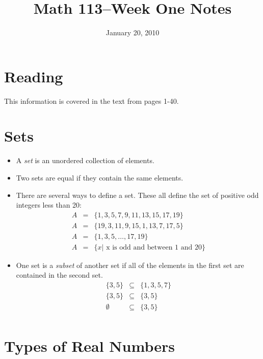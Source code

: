 \documentclass[fleqn]{article}
\title{Math 113--Week One Notes}
\author{}
\date{January 20, 2010}
\begin{document}
\maketitle

\section{Reading}

This information is covered in the text from pages 1-40.

\section{Sets}

\begin{itemize}
  \item A {\em set} is an unordered collection of elements.  

  \item Two sets are equal if they contain the same elements.

  \item There are several ways to define a set.  These all define the set of positive odd integers less than 20:
    \begin{eqnarray*}
      A & = & \{ 1, 3, 5, 7, 9, 11, 13, 15, 17, 19 \}          \\
      A & = & \{ 19, 3, 11, 9, 15, 1, 13, 7, 17, 5 \}          \\
      A & = & \{ 1, 3, 5, \ldots, 17, 19 \}                    \\
      A & = & \{ x | \text{ x is odd and between 1 and 20} \}
    \end{eqnarray*}

  \item One set is a {\em subset} of another set if all of the elements in the first set are contained in the second set.
    \begin{eqnarray*}
      \{ 3, 5 \} & \subseteq & \{ 1, 3, 5, 7 \}          \\
      \{ 3, 5 \} & \subseteq & \{ 3, 5 \} \\
      \emptyset  & \subseteq & \{ 3, 5 \} \\
    \end{eqnarray*}
\end{itemize}

\section{Types of Real Numbers}
\end{document}
